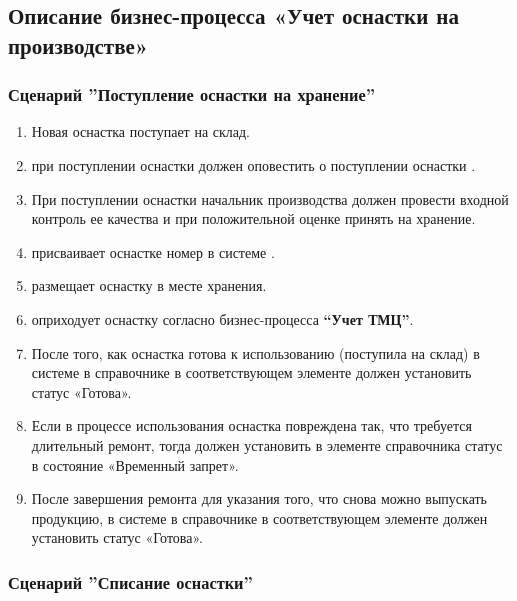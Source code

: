 \subsection{Описание бизнес-процесса «Учет оснастки на производстве»}

\subsubsection{Сценарий ''Поступление оснастки на хранение''}
\label{bp:tool_1}

\begin{enumerate}

\item Новая оснастка поступает на склад. 
\item \kladovshik при поступлении оснастки должен оповестить о поступлении оснастки \tehnolog.
\item 	При поступлении оснастки начальник производства должен провести входной контроль ее качества и при положительной оценке принять на хранение.
\item 	\tehnolog присваивает оснастке номер в системе \gofro.
\item 	\tehnolog размещает оснастку в месте хранения.
\item 	\kladovshik оприходует оснастку согласно бизнес-процесса \textbf{“Учет ТМЦ”}.
\item 	После того, как оснастка готова к использованию (поступила на склад) \tehnolog в системе \gofro в справочнике  в соответствующем элементе должен установить статус «Готова».
\item 	Если в процессе использования оснастка повреждена так, что требуется длительный ремонт, тогда \tehnolog должен установить в элементе справочника  статус в состояние «Временный запрет». 
\item 	После завершения ремонта для указания того, что снова можно выпускать продукцию, \tehnolog в системе \gofro в справочнике  в соответствующем элементе должен установить статус «Готова».
\end{enumerate}

\subsubsection{Сценарий ''Списание оснастки''}
\label{bp:tool_2}

